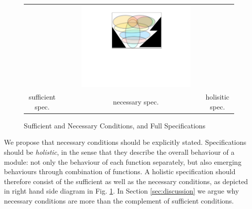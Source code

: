 \begin{figure}[htb]
\begin{tabular}{ccccc}
\begin{minipage}{0.25\textwidth}
\end{minipage}
 & \ \ \ &
\begin{minipage}{0.25\textwidth}
 \includegraphics[width=\linewidth, trim=250  320 260 60,clip]{diagrams/NecAndSuff.pdf}
\end{minipage}
\\
sufficient  spec.& & necessary spec. & & holisitic spec.
 \end{tabular}
  \vspace*{-2.5mm}
  \caption{Sufficient and Necessary Conditions, and Full Specifications}
 \label{fig:NecessaryAndSuff}
 \end{figure}
 
 We propose that  necessary conditions should be explicitly stated. Specifications should be \emph{holistic}, in the sense that they describe the  overall behaviour of a module: not only the behaviour  of each function separately, but also 
 emerging behaviours through combination of functions.
A holistic specification should therefore consist of   the sufficient as well as the necessary conditions, as  
depicted in right hand side  diagram in Fig. \ref{fig:NecessaryAndSuff}.
In Section \ref{sec:discussion} we argue why necessary conditions are more than the complement of
sufficient conditions.

